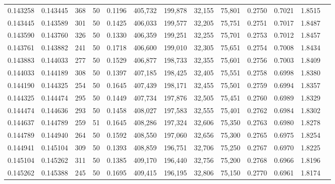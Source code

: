 \begin{tabular}{rrrrrrrrrrrrr}
0.143258 & 0.143445 &   368 &  50 &                                     0.1196 & 405,732 & 199,878 &  32,155 &  75,801 & 0.2750 & 0.7021 & 1.8515 \\
0.143445 & 0.143589 &   301 &  50 &                                     0.1425 & 406,033 & 199,577 &  32,205 &  75,751 & 0.2751 & 0.7017 & 1.8487 \\
0.143590 & 0.143760 &   326 &  50 &                                     0.1330 & 406,359 & 199,251 &  32,255 &  75,701 & 0.2753 & 0.7012 & 1.8457 \\
0.143761 & 0.143882 &   241 &  50 &                                     0.1718 & 406,600 & 199,010 &  32,305 &  75,651 & 0.2754 & 0.7008 & 1.8434 \\
0.143883 & 0.144033 &   277 &  50 &                                     0.1529 & 406,877 & 198,733 &  32,355 &  75,601 & 0.2756 & 0.7003 & 1.8409 \\
0.144033 & 0.144189 &   308 &  50 &                                     0.1397 & 407,185 & 198,425 &  32,405 &  75,551 & 0.2758 & 0.6998 & 1.8380 \\
0.144190 & 0.144325 &   254 &  50 &                                     0.1645 & 407,439 & 198,171 &  32,455 &  75,501 & 0.2759 & 0.6994 & 1.8357 \\
0.144325 & 0.144474 &   295 &  50 &                                     0.1449 & 407,734 & 197,876 &  32,505 &  75,451 & 0.2760 & 0.6989 & 1.8329 \\
0.144474 & 0.144636 &   293 &  50 &                                     0.1458 & 408,027 & 197,583 &  32,555 &  75,401 & 0.2762 & 0.6984 & 1.8302 \\
0.144637 & 0.144789 &   259 &  51 &                                     0.1645 & 408,286 & 197,324 &  32,606 &  75,350 & 0.2763 & 0.6980 & 1.8278 \\
0.144789 & 0.144940 &   264 &  50 &                                     0.1592 & 408,550 & 197,060 &  32,656 &  75,300 & 0.2765 & 0.6975 & 1.8254 \\
0.144941 & 0.145104 &   309 &  50 &                                     0.1393 & 408,859 & 196,751 &  32,706 &  75,250 & 0.2767 & 0.6970 & 1.8225 \\
0.145104 & 0.145262 &   311 &  50 &                                     0.1385 & 409,170 & 196,440 &  32,756 &  75,200 & 0.2768 & 0.6966 & 1.8196 \\
0.145262 & 0.145388 &   245 &  50 &                                     0.1695 & 409,415 & 196,195 &  32,806 &  75,150 & 0.2770 & 0.6961 & 1.8174 \\

\end{tabular}
